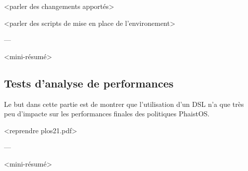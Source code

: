 <parler des changements apportés>

<parler des scripts de mise en place de l'environement>

\begin{center}
    ---
\end{center}
    
<mini-résumé>

\subsection{Tests d'analyse de performances}

Le but dans cette partie est de montrer que l'utilisation d'un DSL n'a que très peu d'impacte sur les performances finales des politiques PhaistOS.

<reprendre plos21.pdf>

\begin{center}
    ---
\end{center}
    
<mini-résumé>
